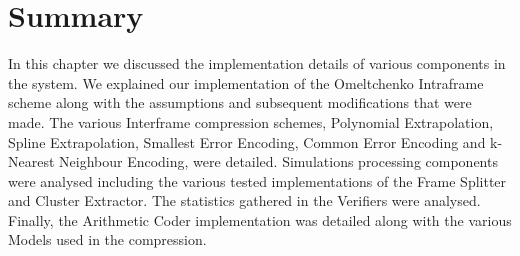 \documentclass[a4paper,11pt]{report}
\begin{document}
\section{Summary}

In this chapter we discussed the implementation details of various components in the system. We explained our implementation of the Omeltchenko Intraframe scheme along with the assumptions and subsequent modifications that were made. The various Interframe compression schemes, Polynomial Extrapolation, Spline Extrapolation, Smallest Error Encoding, Common Error Encoding and k-Nearest Neighbour Encoding, were detailed. Simulations processing components were analysed including the various tested implementations of the Frame Splitter and Cluster Extractor. The statistics gathered in the Verifiers were analysed. Finally, the Arithmetic Coder implementation was detailed along with the various Models used in the compression.
\end{document}
